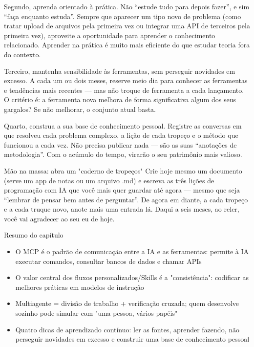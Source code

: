 Segundo, aprenda orientado à prática. Não “estude tudo para depois fazer”, e sim “faça enquanto estuda”. Sempre que aparecer um tipo novo de problema (como tratar upload de arquivos pela primeira vez ou integrar uma API de terceiros pela primeira vez), aproveite a oportunidade para aprender o conhecimento relacionado. Aprender na prática é muito mais eficiente do que estudar teoria fora do contexto.

Terceiro, mantenha sensibilidade às ferramentas, sem perseguir novidades em excesso. A cada um ou dois meses, reserve meio dia para conhecer as ferramentas e tendências mais recentes — mas não troque de ferramenta a cada lançamento. O critério é: a ferramenta nova melhora de forma significativa algum dos seus gargalos? Se não melhorar, o conjunto atual basta.

Quarto, construa a sua base de conhecimento pessoal. Registre as conversas em que resolveu cada problema complexo, a lição de cada tropeço e o método que funcionou a cada vez. Não precisa publicar nada — são as suas “anotações de metodologia”. Com o acúmulo do tempo, virarão o seu patrimônio mais valioso.

\begin{tcbpractice}{Mão na massa: abra um "caderno de tropeços"}
Crie hoje mesmo um documento (serve um app de notas ou um arquivo .md) e escreva as três lições de programação com IA que você mais quer guardar até agora — mesmo que seja “lembrar de pensar bem antes de perguntar”. De agora em diante, a cada tropeço e a cada truque novo, anote mais uma entrada lá. Daqui a seis meses, ao reler, você vai agradecer ao seu eu de hoje.

\end{tcbpractice}

\begin{tcbsummary}{Resumo do capítulo}
\begin{itemize}
  \item O MCP é o padrão de comunicação entre a IA e as ferramentas: permite à IA executar comandos, consultar bancos de dados e chamar APIs
  \item O valor central dos fluxos personalizados/Skills é a "consistência": codificar as melhores práticas em modelos de instrução
  \item Multiagente = divisão de trabalho + verificação cruzada; quem desenvolve sozinho pode simular com "uma pessoa, vários papéis"
  \item Quatro dicas de aprendizado contínuo: ler as fontes, aprender fazendo, não perseguir novidades em excesso e construir uma base de conhecimento pessoal
\end{itemize}

\end{tcbsummary}
